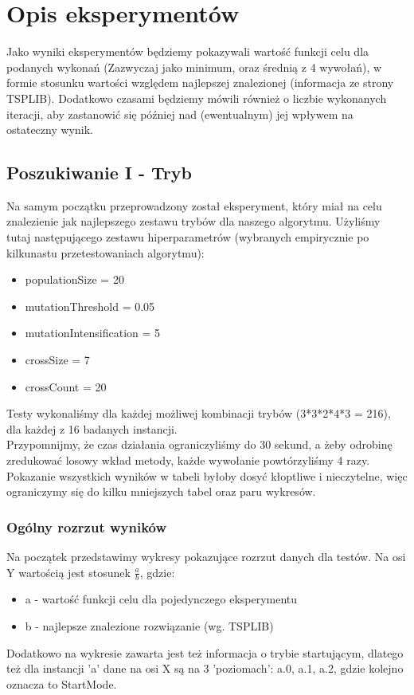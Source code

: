 \documentclass{article}
\begin{document}
\newpage
\section{Opis eksperymentów}
Jako wyniki eksperymentów będziemy pokazywali wartość funkcji celu dla podanych wykonań (Zazwyczaj jako minimum, oraz średnią z 4 wywołań), w formie stosunku wartości względem najlepszej znalezionej (informacja ze strony TSPLIB). Dodatkowo czasami będziemy mówili również o liczbie wykonanych iteracji, aby zastanowić się później nad (ewentualnym) jej wpływem na ostateczny wynik.

\subsection{Poszukiwanie I - Tryb}
Na samym początku przeprowadzony został eksperyment, który miał na celu znalezienie jak najlepszego zestawu trybów dla naszego algorytmu. Użyliśmy tutaj następującego zestawu hiperparametrów (wybranych empirycznie po kilkunastu przetestowaniach algorytmu):
\begin{itemize}
	\item populationSize = 20
	\item mutationThreshold = 0.05
	\item mutationIntensification = 5
	\item crossSize = 7
	\item crossCount = 20
\end{itemize}
Testy wykonaliśmy dla każdej możliwej kombinacji trybów (3*3*2*4*3 = 216), dla każdej z 16 badanych instancji.\\
Przypomnijmy, że czas działania ograniczyliśmy do 30 sekund, a żeby odrobinę zredukować losowy wkład metody, każde wywołanie powtórzyliśmy 4 razy.\\
Pokazanie wszystkich wyników w tabeli byłoby dosyć kłoptliwe i nieczytelne, więc ograniczymy się do kilku mniejszych tabel oraz paru wykresów.\\

\subsubsection{Ogólny rozrzut wyników}
Na początek przedstawimy wykresy pokazujące rozrzut danych dla testów. Na osi Y wartością jest stosunek $\frac{a}{b}$, gdzie:
\begin{itemize}
	\item a - wartość funkcji celu dla pojedynczego eksperymentu
	\item b - najlepsze znalezione rozwiązanie (wg. TSPLIB)
\end{itemize}
Dodatkowo na wykresie zawarta jest też informacja o trybie startującym, dlatego też dla instancji 'a' dane na osi X są na 3 'poziomach': a.0, a.1, a.2, gdzie kolejno oznacza to StartMode.\\
\end{document}
